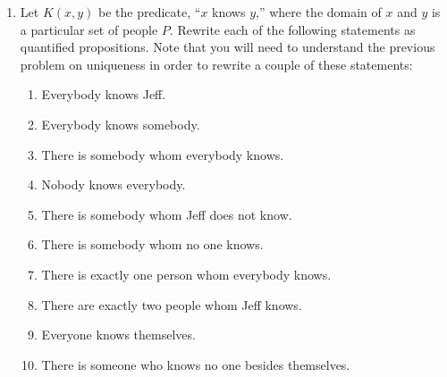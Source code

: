 \documentclass[letterpaper,12pt,fleqn]{article}
\begin{document}
\begin{enumerate}[left=0in,itemsep=0.5in]
\item Let \(K(x,y)\) be the predicate, ``\(x\) knows \(y\),'' where the domain of \(x\) and \(y\) is a particular
  set of people \(P\).  Rewrite each of the following statements as quantified propositions.  Note that you will
  need to understand the previous problem on uniqueness in order to rewrite a couple of these statements:
  \begin{enumerate}
  \item Everybody knows Jeff.
  \item Everybody knows somebody.
  \item There is somebody whom everybody knows.
  \item Nobody knows everybody.
  \item There is somebody whom Jeff does not know.
  \item There is somebody whom no one knows.
  \item There is exactly one person whom everybody knows.
  \item There are exactly two people whom Jeff knows.
  \item Everyone knows themselves.
  \item There is someone who knows no one besides themselves.
  \end{enumerate}

\end{enumerate}
\end{document}
